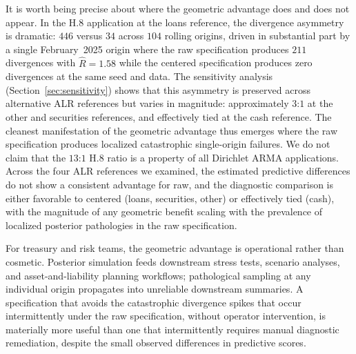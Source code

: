 \documentclass[12pt]{article}
\theoremstyle{remark}
\begin{document}
It is worth being precise about where the geometric advantage does and does not appear. In the H.8 application at the loans reference, the divergence asymmetry is dramatic: $446$ versus $34$ across $104$ rolling origins, driven in substantial part by a single February~2025 origin where the raw specification produces $211$ divergences with $\widehat R=1.58$ while the centered specification produces zero divergences at the same seed and data. The sensitivity analysis (Section~\ref{sec:sensitivity}) shows that this asymmetry is preserved across alternative ALR references but varies in magnitude: approximately $3$:$1$ at the other and securities references, and effectively tied at the cash reference. The cleanest manifestation of the geometric advantage thus emerges where the raw specification produces localized catastrophic single-origin failures. We do not claim that the $13$:$1$ H.8 ratio is a property of all Dirichlet ARMA applications. Across the four ALR references we examined, the estimated predictive differences do not show a consistent advantage for raw, and the diagnostic comparison is either favorable to centered (loans, securities, other) or effectively tied (cash), with the magnitude of any geometric benefit scaling with the prevalence of localized posterior pathologies in the raw specification.

For treasury and risk teams, the geometric advantage is operational rather than cosmetic. Posterior simulation feeds downstream stress tests, scenario analyses, and asset-and-liability planning workflows; pathological sampling at any individual origin propagates into unreliable downstream summaries. A specification that avoids the catastrophic divergence spikes that occur intermittently under the raw specification, without operator intervention, is materially more useful than one that intermittently requires manual diagnostic remediation, despite the small observed differences in predictive scores.
\end{document}
